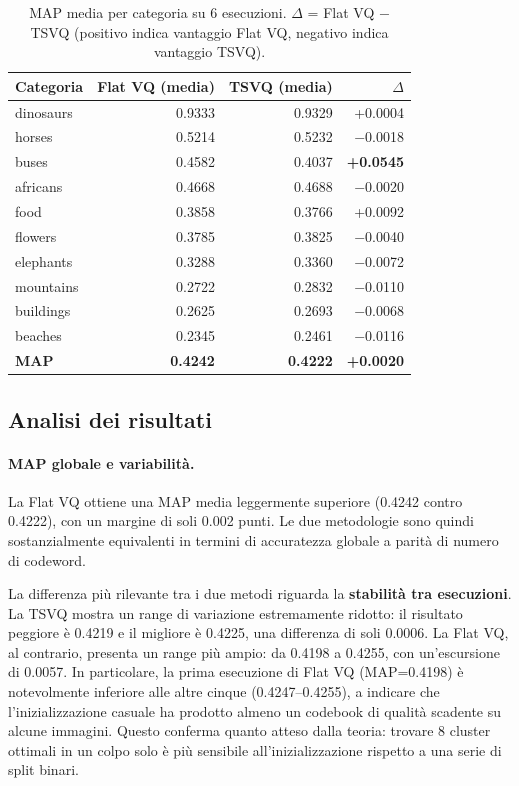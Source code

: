 \documentclass[12pt, a4paper]{article}
\begin{document}
\begin{table}[H]
\centering
\begin{tabular}{lrrr}
\toprule
\textbf{Categoria} & \textbf{Flat VQ (media)} & \textbf{TSVQ (media)} & \textbf{$\Delta$} \\
\midrule
dinosaurs  & 0.9333 & 0.9329 & +0.0004 \\
horses     & 0.5214 & 0.5232 & $-$0.0018 \\
buses      & 0.4582 & 0.4037 & \textbf{+0.0545} \\
africans   & 0.4668 & 0.4688 & $-$0.0020 \\
food       & 0.3858 & 0.3766 & +0.0092 \\
flowers    & 0.3785 & 0.3825 & $-$0.0040 \\
elephants  & 0.3288 & 0.3360 & $-$0.0072 \\
mountains  & 0.2722 & 0.2832 & $-$0.0110 \\
buildings  & 0.2625 & 0.2693 & $-$0.0068 \\
beaches    & 0.2345 & 0.2461 & $-$0.0116 \\
\midrule
\textbf{MAP} & \textbf{0.4242} & \textbf{0.4222} & \textbf{+0.0020} \\
\bottomrule
\end{tabular}
\caption{MAP media per categoria su 6 esecuzioni. $\Delta$ = Flat VQ $-$ TSVQ (positivo
indica vantaggio Flat VQ, negativo indica vantaggio TSVQ).}
\label{tab:categories}
\end{table}

\subsection{Analisi dei risultati}

\paragraph{MAP globale e variabilità.}
La Flat VQ ottiene una MAP media leggermente superiore (0.4242 contro 0.4222), con un margine
di soli 0.002 punti. Le due metodologie sono quindi sostanzialmente equivalenti in termini
di accuratezza globale a parità di numero di codeword.

La differenza più rilevante tra i due metodi riguarda la \textbf{stabilità tra esecuzioni}.
La TSVQ mostra un range di variazione estremamente ridotto: il risultato peggiore è 0.4219
e il migliore è 0.4225, una differenza di soli 0.0006. La Flat VQ, al contrario, presenta
un range più ampio: da 0.4198 a 0.4255, con un'escursione di 0.0057. In particolare,
la prima esecuzione di Flat VQ (MAP=0.4198) è notevolmente inferiore alle altre cinque
(0.4247--0.4255), a indicare che l'inizializzazione casuale ha prodotto almeno un codebook
di qualità scadente su alcune immagini. Questo conferma quanto atteso dalla teoria: trovare
8 cluster ottimali in un colpo solo è più sensibile all'inizializzazione rispetto a una serie
di split binari.
\end{document}
